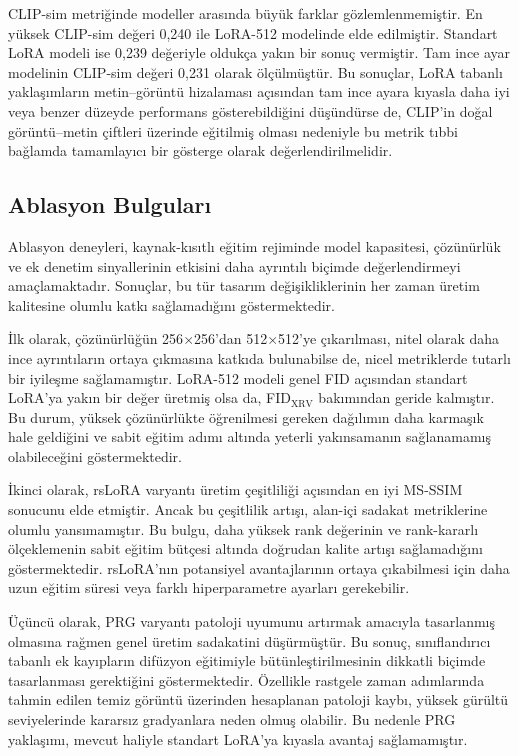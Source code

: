 \documentclass[11pt]{article}
\begin{document}
CLIP-sim metriğinde modeller arasında büyük farklar gözlemlenmemiştir.
En yüksek CLIP-sim değeri 0,240 ile LoRA-512 modelinde elde edilmiştir.
Standart LoRA modeli ise 0,239 değeriyle oldukça yakın bir sonuç vermiştir.
Tam ince ayar modelinin CLIP-sim değeri 0,231 olarak ölçülmüştür. Bu sonuçlar,
LoRA tabanlı yaklaşımların metin--görüntü hizalaması açısından tam ince ayara
kıyasla daha iyi veya benzer düzeyde performans gösterebildiğini düşündürse de,
CLIP'in doğal görüntü--metin çiftleri üzerinde eğitilmiş olması nedeniyle bu
metrik tıbbi bağlamda tamamlayıcı bir gösterge olarak değerlendirilmelidir.

\subsection{Ablasyon Bulguları}

Ablasyon deneyleri, kaynak-kısıtlı eğitim rejiminde model kapasitesi, çözünürlük
ve ek denetim sinyallerinin etkisini daha ayrıntılı biçimde değerlendirmeyi
amaçlamaktadır. Sonuçlar, bu tür tasarım değişikliklerinin her zaman üretim
kalitesine olumlu katkı sağlamadığını göstermektedir.

İlk olarak, çözünürlüğün 256$\times$256'dan 512$\times$512'ye çıkarılması,
nitel olarak daha ince ayrıntıların ortaya çıkmasına katkıda bulunabilse de,
nicel metriklerde tutarlı bir iyileşme sağlamamıştır. LoRA-512 modeli genel
FID açısından standart LoRA'ya yakın bir değer üretmiş olsa da,
FID$_{\text{XRV}}$ bakımından geride kalmıştır. Bu durum, yüksek çözünürlükte
öğrenilmesi gereken dağılımın daha karmaşık hale geldiğini ve sabit eğitim
adımı altında yeterli yakınsamanın sağlanamamış olabileceğini göstermektedir.

İkinci olarak, rsLoRA varyantı üretim çeşitliliği açısından en iyi MS-SSIM
sonucunu elde etmiştir. Ancak bu çeşitlilik artışı, alan-içi sadakat
metriklerine olumlu yansımamıştır. Bu bulgu, daha yüksek rank değerinin ve
rank-kararlı ölçeklemenin sabit eğitim bütçesi altında doğrudan kalite artışı
sağlamadığını göstermektedir. rsLoRA'nın potansiyel avantajlarının ortaya
çıkabilmesi için daha uzun eğitim süresi veya farklı hiperparametre ayarları
gerekebilir.

Üçüncü olarak, PRG varyantı patoloji uyumunu artırmak amacıyla tasarlanmış
olmasına rağmen genel üretim sadakatini düşürmüştür. Bu sonuç, sınıflandırıcı
tabanlı ek kayıpların difüzyon eğitimiyle bütünleştirilmesinin dikkatli biçimde
tasarlanması gerektiğini göstermektedir. Özellikle rastgele zaman adımlarında
tahmin edilen temiz görüntü üzerinden hesaplanan patoloji kaybı, yüksek gürültü
seviyelerinde kararsız gradyanlara neden olmuş olabilir. Bu nedenle PRG
yaklaşımı, mevcut haliyle standart LoRA'ya kıyasla avantaj sağlamamıştır.
\end{document}
